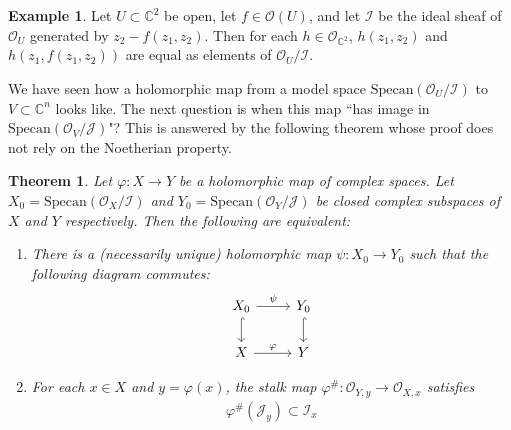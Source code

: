 \documentclass[12pt,b5paper,notitlepage]{report}
\theoremstyle{definition}
\newtheorem{eg}[df]{Example}
\theoremstyle{plain}
\newtheorem{thm}[df]{Theorem}
\newcommand{\mc}{\mathcal}
\newcommand{\scr}{\mathscr}
\newcommand{\Cbb}{\mathbb C}
\newcommand{\Specan}{\mathrm{Specan}}
\numberwithin{equation}{section}
\begin{document}
\begin{eg}
Let $U\subset\Cbb^2$ be open, let $f\in\scr O(U)$, and let $\mc I$ be the ideal sheaf of $\scr O_U$ generated by $z_2-f(z_1,z_2)$. Then for each $h\in\scr O_{\Cbb^2}$, $h(z_1,z_2)$ and $h(z_1,f(z_1,z_2))$ are equal as elements of $\scr O_U/\mc I$. %
\end{eg}




We have seen how a holomorphic map from a model space $\Specan(\scr O_U/\mc I)$ to $V\subset\Cbb^n$ looks like. The next question is when this map ``has image in $\Specan(\scr O_V/\mc J)$"? This is answered by the following theorem whose proof does not rely on the Noetherian property.



\begin{thm}\label{lb13}
Let $\varphi:X\rightarrow Y$ be a holomorphic map of complex spaces. Let $X_0=\Specan(\scr O_X/\mc I)$ and $Y_0=\Specan(\scr O_Y/\mc J)$ be closed complex subspaces of $X$ and $Y$ respectively. Then the following are equivalent:
\begin{enumerate}[label=(\alph*)]
\item There is a (necessarily unique) holomorphic map $\psi:X_0\rightarrow Y_0$ such that the following diagram commutes:
\begin{equation}\label{eq7}
\begin{tikzcd}
X_0 \arrow[r, "\psi"] \arrow[d, hook] & Y_0 \arrow[d, hook] \\
X \arrow[r,"\varphi"]                                            & Y               
\end{tikzcd}
\end{equation}
\item For each $x\in X$ and $y=\varphi(x)$, the stalk map $\varphi^\#:\scr O_{Y,y}\rightarrow\scr O_{X,x}$ satisfies
\begin{align*}
\varphi^\#(\mc J_y)\subset\mc I_x
\end{align*}
\end{enumerate}
\end{thm}
\end{document}
